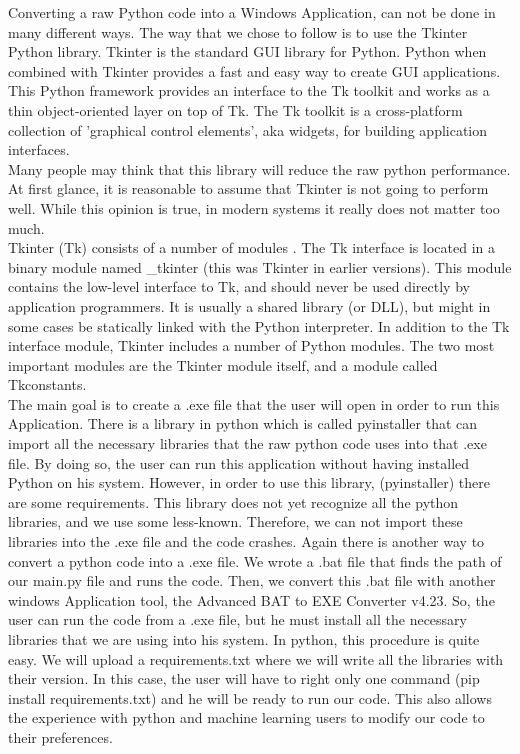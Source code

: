 Converting a raw Python code into a Windows Application, can not be done in many different ways. The way that we chose to follow is to use the Tkinter Python library. Tkinter is the standard GUI library for Python. Python when combined with Tkinter provides a fast and easy way to create GUI applications. This Python framework provides an interface to the Tk toolkit and works as a thin object-oriented layer on top of Tk. The Tk toolkit is a cross-platform collection of  'graphical control elements', aka widgets, for building application interfaces.\\

Many people may think that this library will reduce the raw python performance. At first glance, it is reasonable to assume that Tkinter is not going to perform well. While this opinion is true, in modern systems it really does not matter too much.\\

Tkinter (Tk) consists of a number of modules \cite{Tkinter 1,Tkinter 2}. The Tk interface is located in a binary module named \_tkinter (this was Tkinter in earlier versions). This module contains the low-level interface to Tk, and should never be used directly by application programmers. It is usually a shared library (or DLL), but might in some cases be statically linked with the Python interpreter. In addition to the Tk interface module, Tkinter includes a number of Python modules. The two most important modules are the Tkinter module itself, and a module called Tkconstants.\\

The main goal is to create a .exe file that the user will open in order to run this Application. There is a library in python which is called pyinstaller that can import all the necessary libraries that the raw python code uses into that .exe file. By doing so, the user can run this application without having installed Python on his system. However, in order to use this library, (pyinstaller) there are some requirements. This library does not yet recognize all the python libraries, and we use some less-known. Therefore, we can not import these libraries into the .exe file and the code crashes. Again there is another way to convert a python code into a .exe file. We wrote a .bat file that finds the path of our main.py file and runs the code. Then, we convert this .bat file with another windows Application tool, the Advanced BAT to EXE Converter v4.23. So, the user can run the code from a .exe file, but he must install all the necessary libraries that we are using into his system. In python, this procedure is quite easy. We will upload a requirements.txt where we will write all the libraries with their version. In this case, the user will have to right only one command (pip install requirements.txt) and he will be ready to run our code. This also allows the experience with python and machine learning users to modify our code to their preferences. 